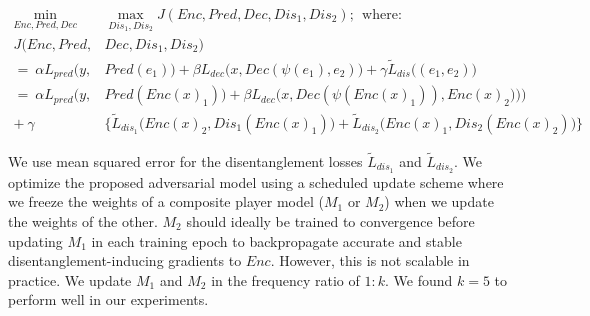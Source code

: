 \vspace{-10pt}
\begin{align}
\min_{Enc, Pred, Dec} \ \ &\max_{Dis_1, Dis_2} J(Enc, Pred, Dec, Dis_1, Dis_2); \ \ \text{where:} \nonumber \\
J(Enc, Pred, &Dec, Dis_1, Dis_2) \nonumber \\
= \ \alpha L_{pred} \bigl(y, &Pred(e_1) \bigr) + \beta L_{dec} \bigl(x, Dec(\psi(e_1), e_2)\bigr) + \gamma \tilde{L}_{dis} \bigl((e_1, e_2) \bigr) \nonumber \\
= \ \alpha L_{pred} \bigl(y, &Pred(Enc(x)_1) \bigr) + \beta L_{dec} \bigl(x, Dec(\psi(Enc(x)_1)), Enc(x)_2))\bigr) \nonumber \\
+ \ \gamma &\bigl\{\tilde{L}_{dis_1} \bigl(Enc(x)_2, Dis_1(Enc(x)_1)\bigr) + \tilde{L}_{dis_2} \bigl(Enc(x)_1, Dis_2(Enc(x)_2)\bigr)\bigr\}
\label{eq:uai}
\end{align}

We use mean squared error for the disentanglement losses $\tilde{L}_{dis_1}$ and $\tilde{L}_{dis_2}$. We optimize the proposed adversarial model using a scheduled update scheme where we freeze the weights of a composite player model ($M_1$ or $M_2$) when we update the weights of the other. $M_2$ should ideally be trained to convergence before updating $M_1$ in each training epoch to backpropagate accurate and stable disentanglement-inducing gradients to $Enc$. However, this is not scalable in practice. We update $M_1$ and $M_2$ in the frequency ratio of $1:k$. We found $k = 5$ to perform well in our experiments.

